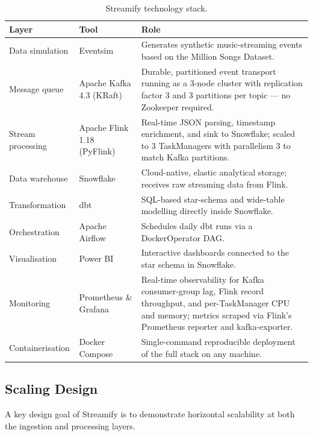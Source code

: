 \begin{table}[H]
  \centering
  \caption{Streamify technology stack.}
  \label{tab:stack}
  \begin{tabularx}{\textwidth}{llX}
    \toprule
    \textbf{Layer}       & \textbf{Tool}              & \textbf{Role} \\
    \midrule
    Data simulation      & Eventsim                   & Generates synthetic music-streaming events based on the Million Songs Dataset. \\
    Message queue        & Apache Kafka 4.3 (KRaft)   & Durable, partitioned event transport running as a 3-node cluster with replication factor 3 and 3 partitions per topic — no Zookeeper required. \\
    Stream processing    & Apache Flink 1.18 (PyFlink) & Real-time JSON parsing, timestamp enrichment, and sink to Snowflake; scaled to 3 TaskManagers with parallelism 3 to match Kafka partitions. \\
    Data warehouse       & Snowflake                  & Cloud-native, elastic analytical storage; receives raw streaming data from Flink. \\
    Transformation       & dbt                        & SQL-based star-schema and wide-table modelling directly inside Snowflake. \\
    Orchestration        & Apache Airflow             & Schedules daily dbt runs via a DockerOperator DAG. \\
    Visualisation        & Power BI                   & Interactive dashboards connected to the star schema in Snowflake. \\
    Monitoring           & Prometheus \& Grafana      & Real-time observability for Kafka consumer-group lag, Flink record throughput, and per-TaskManager CPU and memory; metrics scraped via Flink's Prometheus reporter and kafka-exporter. \\
    Containerisation     & Docker Compose             & Single-command reproducible deployment of the full stack on any machine. \\
    \bottomrule
  \end{tabularx}
\end{table}

\subsection*{Scaling Design}

A key design goal of Streamify is to demonstrate horizontal scalability at both the
ingestion and processing layers.

